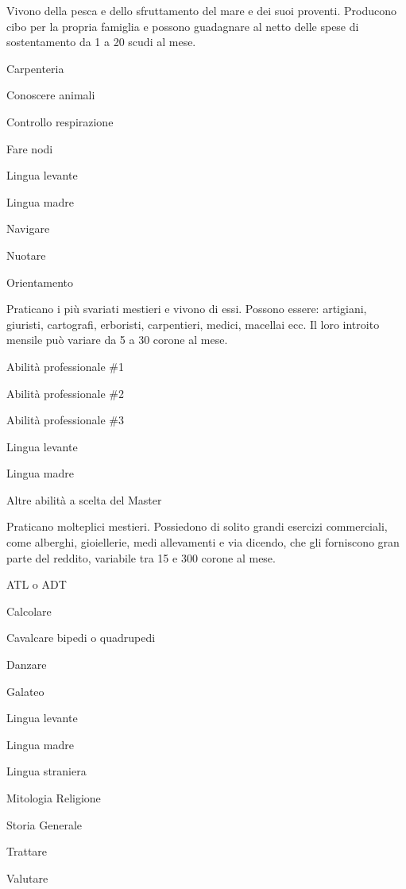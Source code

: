 
Vivono della pesca e dello sfruttamento del mare e dei suoi proventi.
Producono cibo per la propria famiglia e possono guadagnare al netto
delle spese di sostentamento da 1 a 20 scudi al mese.

\begin{abilist}
\item Carpenteria
\item Conoscere animali
\item Controllo respirazione
\item Fare nodi
\item Lingua levante
\item Lingua madre
\item Navigare
\item Nuotare
\item Orientamento
\end{abilist}


Praticano i pi\`u svariati mestieri e vivono di essi. Possono essere:
artigiani, giuristi, cartografi, erboristi, carpentieri, medici,
macellai ecc. Il loro introito mensile pu\`o variare da 5 a 30
corone al mese.

\begin{abilist}
\item Abilit\`a professionale \#1
\item Abilit\`a professionale \#2
\item Abilit\`a professionale \#3
\item Lingua levante
\item Lingua madre
\item Altre abilit\`a a scelta del Master
\end{abilist}


Praticano molteplici mestieri. Possiedono di solito grandi esercizi
commerciali, come alberghi, gioiellerie, medi allevamenti e via
dicendo, che gli forniscono gran parte del reddito, variabile tra 15 e
300 corone al mese.

\begin{abilist}
\item ATL o ADT
\item Calcolare
\item Cavalcare bipedi o quadrupedi
\item Danzare
\item Galateo
\item Lingua levante
\item Lingua madre
\item Lingua straniera
\item Mitologia Religione
\item Storia Generale
\item Trattare
\item Valutare
\end{abilist}

